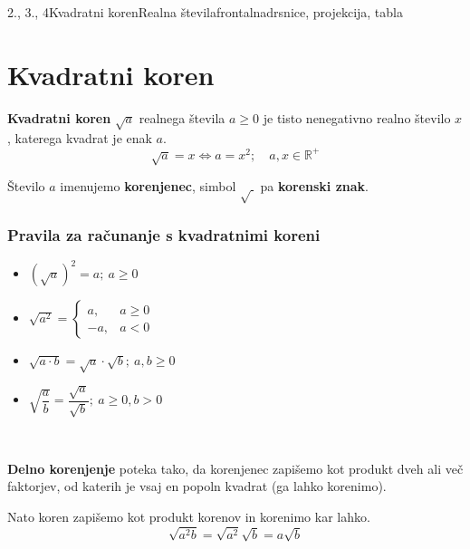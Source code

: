 \begin{priprava}{2., 3., 4}{}{Kvadratni koren}{Realna števila}{frontalna}{drsnice, projekcija, tabla}
    
    \section{Kvadratni koren}

            
                \textbf{Kvadratni koren} $\sqrt{a}$ realnega števila $a\geq 0$ je tisto nenegativno realno število $x$,
                katerega kvadrat je enak $a$.
                $$\sqrt{a}=x \Leftrightarrow a=x^2; \quad a,x\in\mathbb{R}^+ $$

                Število $a$ imenujemo \textbf{korenjenec}, simbol $\sqrt{~}$ pa \textbf{korenski znak}.
            

            \subsubsection*{Pravila za računanje s kvadratnimi koreni}
                    
                        \begin{itemize}
                            \item $\left(\sqrt{a}\right)^2=a; ~a\geq 0$
                            \item $\sqrt{a^2}=\begin{cases}
                                a, & a\geq 0 \\
                                -a, & a<0
                            \end{cases}$
                            \item $\sqrt{a\cdot b}=\sqrt{a}\cdot\sqrt{b}; ~a,b\geq 0$
                            \item $\sqrt{\dfrac{a}{b}}=\dfrac{\sqrt{a}}{\sqrt{b}}; ~a\geq 0, b>0$
                        \end{itemize}
                    
            

                ~~

                \textbf{Delno korenjenje} poteka tako, da korenjenec zapišemo kot produkt dveh ali več faktorjev,
                od katerih je vsaj en popoln kvadrat (ga lahko korenimo).
                
                Nato koren zapišemo kot produkt korenov in korenimo kar lahko.
                $$\sqrt{a^2b}=\sqrt{a^2}\sqrt{b}=a\sqrt{b}$$
            

\end{priprava}
